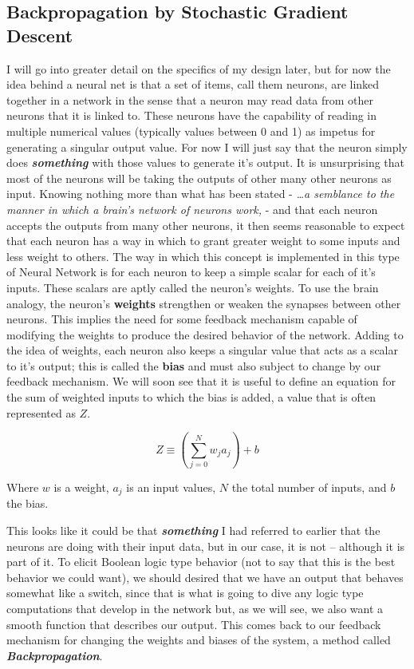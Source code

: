 \documentclass[a4paper,10pt]{article}
\let\oldemph\emph
\renewcommand{\emph}[1]{\textbf{\oldemph{#1}}}
\newcommand{\mathwords}[1]{
	{
		\linespread{.95}
		\begin{adjustwidth}{8em}{8em}
			\footnotesize
			#1 
		\end{adjustwidth}
	}
}
\begin{document}
\subsection{Backpropagation by Stochastic Gradient Descent}

I will go into greater detail on the specifics of my design later, but for now the idea behind a neural net is
that a set of items, call them neurons, are linked together in a network in the sense that a neuron may read data
from other neurons that it is linked to. These neurons have the capability of reading in multiple numerical values
(typically values between 0 and 1) as impetus for generating a singular output value. For now I will just say that the
neuron simply does \emph{something} with those values to generate it's output. It is unsurprising that most of the
neurons will be taking the outputs of other many other neurons as input. Knowing nothing more than what has been stated
- \textit{\ldots a semblance to the manner in which a brain's network of neurons work,} - and that each neuron accepts
the outputs from many other neurons, it then seems reasonable to expect that each neuron has a way in which to grant
greater weight to some inputs and less weight to others. The way in which this concept is implemented in this type of
Neural Network is for each neuron to keep a simple scalar for each of it's inputs.  These scalars are aptly called the
neuron's \textmd{weights}.  To use the brain analogy, the neuron's \textbf{weights} strengthen or weaken the synapses
between other neurons.  This implies the need for some feedback mechanism capable of modifying the weights to
produce the desired behavior of the network. Adding to the idea of weights, each neuron also keeps a singular value that
acts as a scalar to it's output; this is called the \textbf{bias} and must also subject to change by our feedback
mechanism.  We will soon see that it is useful to define an equation for the sum of weighted inputs to which the bias is
added, a value that is often represented as $Z$.

\begin{equation}\label{Zval} 
Z \equiv \left( \sum^N_{j=0} w_j a_j \right)   + b
\end{equation}

\mathwords{ Where $w$ is a weight, $a_j$ is an input values, $N$ the total number of inputs, and $b$ the bias.} 

This looks like it could be that \emph{something} I had referred to earlier that the neurons are doing with their input
data, but in our case, it is not -- although it is part of it.  To elicit Boolean logic type behavior (not to say that
this is the best behavior we could want), we should desired that we have an output that behaves somewhat like a switch,
since that is what is going to dive any logic type computations that develop in the network but,  as we will see, we
also want a smooth function that describes our output.  This comes back to our feedback mechanism for changing the
weights and biases of the system, a method called \emph{Backpropagation}.
\end{document}
